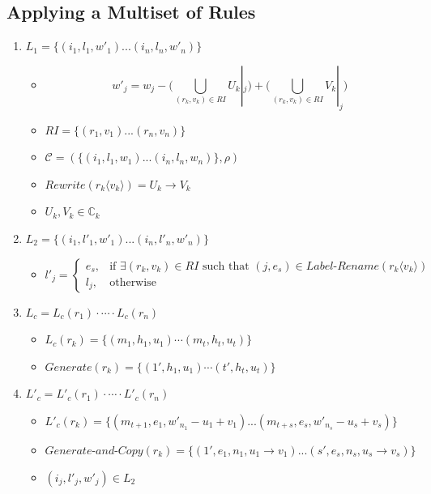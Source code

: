 \documentclass{article}
\newcommand{\mn}{\text{-}}
\begin{document}
\begin{appendices}

\subsection{Applying a Multiset of Rules} \label{a-ff2-apply}

\begin{enumerate}
   \item $L_1 = \{(i_1,l_1,w'_1)...(i_n,l_n,w'_n)\}$
         \begin{itemize}
         \item $$w'_j = w_j - \Bigg(\bigcup_{(r_k,v_k)\in RI} U_k |_j \Bigg) + \Bigg(\bigcup_{(r_k,v_k) \in RI } V_k|_j \Bigg)$$
         \item $RI = \{(r_1,v_1)...(r_n,v_n)\}$
         \item $\mathcal{C} = (\{(i_1,l_1,w_1)...(i_n,l_n,w_n)\},\rho)$ 
         \item $Rewrite(r_k\langle v_k \rangle) = U_k \rightarrow V_k$
         \item $U_k,V_k \in \mathbb{C}_k$
         \end{itemize}

   \item $L_2 = \{(i_1,l'_1,w'_1)...(i_n,l'_n,w'_n)\}$
         \begin{itemize}
         \item \[ l'_j = \begin{cases} 
                         e_s, & \text{if } \exists(r_k,v_k)\in RI \text{ such that } (j,e_s) \in Label\mn Rename(r_k\langle v_k\rangle)\\
                         l_j, & \text{otherwise} 
                         \end{cases}\] 
        \end{itemize}

   \item $L_c = L_c(r_1) \cdot \cdots \cdot L_c(r_n)$
         \begin{itemize}
         \item $L_c(r_k) = \{(m_1, h_1, u_1)\cdots (m_t,h_t,u_t)\}$
         \item $Generate(r_k) = \{(1', h_1, u_1) \cdots (t', h_t, u_t)\}$
         \end{itemize}

   \item $L'_c = L'_c(r_1)\cdot \cdots \cdot L'_c(r_n)$
         \begin{itemize}
         \item $L'_c(r_k) = \{(m_{t+1},e_1, w'_{n_1} - u_1 + v_1)...(m_{t+s}, e_s, w'_{n_s} - u_s + v_s)\}$
         \item $Generate\mn and \mn Copy(r_k) = \{(1',e_1, n_1, u_1 \rightarrow v_1)...(s', e_s, n_s, u_s \rightarrow v_s)\}$
         \item $(i_j, l'_j, w'_j) \in L_2$
         \end{itemize}


\end{enumerate}
\end{appendices}
\end{document}
